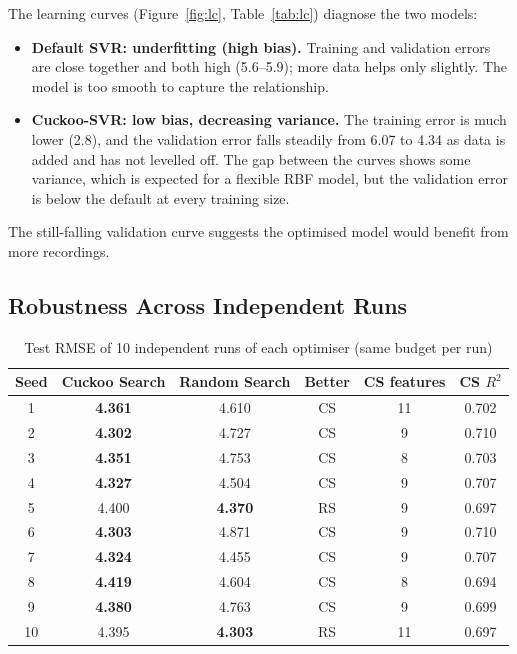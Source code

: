 \documentclass[12pt,a4paper]{article}
\numberwithin{equation}{section}
\numberwithin{table}{section}
\numberwithin{figure}{section}
\begin{document}
The learning curves (Figure~\ref{fig:lc}, Table~\ref{tab:lc}) diagnose the two models:
\begin{itemize}
  \item \textbf{Default SVR: underfitting (high bias).} Training and validation errors are close together and both high (5.6--5.9); more data helps only slightly. The model is too smooth to capture the relationship.
  \item \textbf{Cuckoo-SVR: low bias, decreasing variance.} The training error is much lower (2.8), and the validation error falls steadily from 6.07 to 4.34 as data is added and has not levelled off. The gap between the curves shows some variance, which is expected for a flexible RBF model, but the validation error is below the default at every training size.
\end{itemize}
The still-falling validation curve suggests the optimised model would benefit from more recordings.

\subsection{Robustness Across Independent Runs}
\begin{table}[H]
\centering
\caption{Test RMSE of 10 independent runs of each optimiser (same budget per run)}
\label{tab:seeds}
\small
\begin{tabular}{@{}cccccc@{}}
\toprule
\textbf{Seed} & \textbf{Cuckoo Search} & \textbf{Random Search} & \textbf{Better} & \textbf{CS features} & \textbf{CS $R^2$} \\ \midrule
1  & \textbf{4.361} & 4.610 & CS & 11 & 0.702 \\
2  & \textbf{4.302} & 4.727 & CS & 9  & 0.710 \\
3  & \textbf{4.351} & 4.753 & CS & 8  & 0.703 \\
4  & \textbf{4.327} & 4.504 & CS & 9  & 0.707 \\
5  & 4.400 & \textbf{4.370} & RS & 9  & 0.697 \\
6  & \textbf{4.303} & 4.871 & CS & 9  & 0.710 \\
7  & \textbf{4.324} & 4.455 & CS & 9  & 0.707 \\
8  & \textbf{4.419} & 4.604 & CS & 8  & 0.694 \\
9  & \textbf{4.380} & 4.763 & CS & 9  & 0.699 \\
10 & 4.395 & \textbf{4.303} & RS & 11 & 0.697 \\ \bottomrule
\end{tabular}
\end{table}
\end{document}
